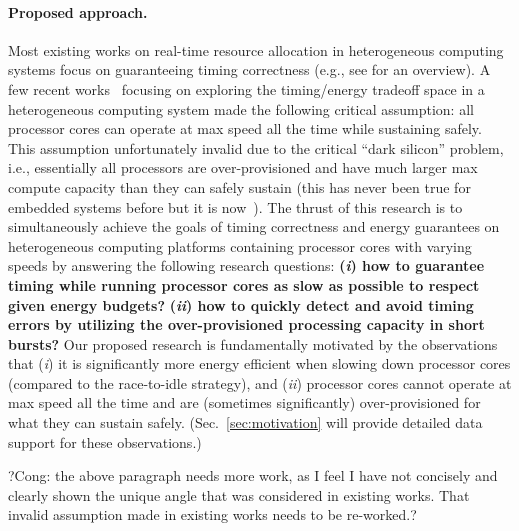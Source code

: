 \vspace{-4mm}
\paragraph{Proposed approach.} 
Most existing works on real-time resource allocation in heterogeneous computing systems focus on guaranteeing timing correctness (e.g., see \cite{raravi2014task, raravi2013assigning, niemeier2011partitioned} for an overview). %
 A few recent works~\cite{?} focusing on exploring the timing/energy tradeoff space in a heterogeneous computing system made the following critical assumption: all processor cores can operate at max speed all the time while sustaining safely. %
  This assumption unfortunately invalid due to the critical ``dark silicon'' problem, i.e., essentially all processors are over-provisioned and have much larger max compute capacity than they can safely sustain (this has never been true for embedded systems before but it is now~\cite{?}). The thrust of this research is to simultaneously achieve the goals of timing correctness and energy guarantees on heterogeneous computing platforms containing processor cores with varying speeds by answering the following research questions: \textbf{(\textit{i}) how to guarantee timing while running processor cores as slow as possible to respect given energy budgets?}   \textbf{(\textit{ii}) how to quickly detect and avoid timing errors by utilizing the over-provisioned processing capacity in short bursts?} Our proposed research is fundamentally motivated by the observations that (\textit{i}) it is significantly more energy efficient when slowing down processor cores (compared to the race-to-idle strategy), and (\textit{ii}) processor cores cannot operate at max speed all the time and are (sometimes significantly) over-provisioned for what they can sustain safely. (Sec.~\ref{sec:motivation} will provide detailed data support for these observations.) 
  
  ?Cong: the above paragraph needs more work, as I feel I have not concisely and clearly shown the unique angle that was considered in existing works. That invalid assumption made in existing works needs to be re-worked.?

